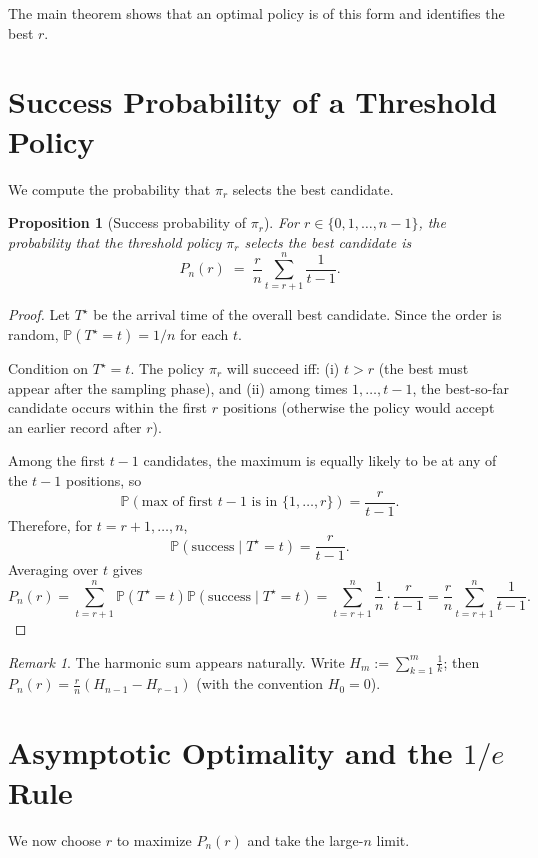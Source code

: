 \documentclass[11pt]{article}
\theoremstyle{plain}
\newtheorem{proposition}[theorem]{Proposition}
\theoremstyle{definition}
\theoremstyle{remark}
\newtheorem{remark}[theorem]{Remark}
\newcommand{\Prob}{\mathbb{P}}
\newcommand{\1}{\mathbf{1}}
\begin{document}
The main theorem shows that an optimal policy is of this form and identifies the best $r$.

\section{Success Probability of a Threshold Policy}
We compute the probability that $\pi_r$ selects the best candidate.

\begin{proposition}[Success probability of $\pi_r$]
For $r\in\{0,1,\dots,n-1\}$, the probability that the threshold policy $\pi_r$ selects the best candidate is
\begin{equation}
P_n(r) \;=\; \frac{r}{n}\sum_{t=r+1}^{n}\frac{1}{t-1}.
\label{eq:success_prob}
\end{equation}
\end{proposition}

\begin{proof}
Let $T^\star$ be the arrival time of the overall best candidate. Since the order is random,
$\Prob(T^\star=t)=1/n$ for each $t$.

Condition on $T^\star=t$. The policy $\pi_r$ will succeed iff:
(i) $t>r$ (the best must appear after the sampling phase), and
(ii) among times $1,\dots,t-1$, the best-so-far candidate occurs within the first $r$ positions
(otherwise the policy would accept an earlier record after $r$).

Among the first $t-1$ candidates, the maximum is equally likely to be at any of the $t-1$ positions, so
\[
\Prob(\text{max of first }t-1\text{ is in } \{1,\dots,r\}) = \frac{r}{t-1}.
\]
Therefore, for $t=r+1,\dots,n$,
\[
\Prob(\text{success} \mid T^\star=t)=\frac{r}{t-1}.
\]
Averaging over $t$ gives
\[
P_n(r)=\sum_{t=r+1}^{n} \Prob(T^\star=t)\Prob(\text{success}\mid T^\star=t)
= \sum_{t=r+1}^{n}\frac{1}{n}\cdot \frac{r}{t-1}
= \frac{r}{n}\sum_{t=r+1}^{n}\frac{1}{t-1}.
\]
\end{proof}

\begin{remark}
The harmonic sum appears naturally. Write $H_m:=\sum_{k=1}^m \frac{1}{k}$; then
$P_n(r)=\frac{r}{n}\left(H_{n-1}-H_{r-1}\right)$ (with the convention $H_0=0$).
\end{remark}

\section{Asymptotic Optimality and the $1/e$ Rule}
We now choose $r$ to maximize $P_n(r)$ and take the large-$n$ limit.
\end{document}
